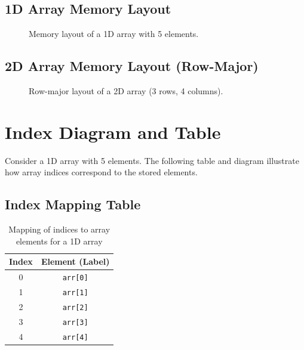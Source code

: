 \subsection*{1D Array Memory Layout}
\begin{figure}[H]
\centering
{}
\caption{Memory layout of a 1D array with 5 elements.}
\end{figure}

\subsection*{2D Array Memory Layout (Row-Major)}
\begin{figure}[H]
\centering
{}
\caption{Row-major layout of a 2D array (3 rows, 4 columns).}
\end{figure}


\section{Index Diagram and Table}

Consider a 1D array with 5 elements. The following table and diagram illustrate how array indices correspond to the stored elements.

\subsection*{Index Mapping Table}
\begin{table}[H]
\centering
\begin{tabular}{|c|c|}
\hline
\textbf{Index} & \textbf{Element (Label)} \\\hline
0 & \texttt{arr[0]} \\\hline
1 & \texttt{arr[1]} \\\hline
2 & \texttt{arr[2]} \\\hline
3 & \texttt{arr[3]} \\\hline
4 & \texttt{arr[4]} \\\hline
\end{tabular}
\caption{Mapping of indices to array elements for a 1D array}
\end{table}


